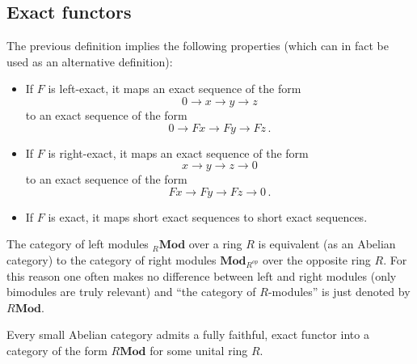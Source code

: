 \subsection{Exact functors}

    \begin{result}
        The previous definition implies the following properties (which can in fact be used as an alternative definition):
        \begin{itemize}
            \item If $F$ is left-exact, it maps an exact sequence of the form \[0\longrightarrow x\longrightarrow y\longrightarrow z\]
            to an exact sequence of the form \[0\longrightarrow Fx\longrightarrow Fy\longrightarrow Fz\,.\]
            \item If $F$ is right-exact, it maps an exact sequence of the form \[x\longrightarrow y\longrightarrow z\longrightarrow 0\]
            to an exact sequence of the form \[Fx\longrightarrow Fy\longrightarrow Fz\longrightarrow 0\,.\]
            \item If $F$ is exact, it maps short exact sequences to short exact sequences.
        \end{itemize}
    \end{result}

    \begin{notation}
        The category of left modules ${}_R\mathbf{Mod}$ over a ring $R$ is equivalent (as an Abelian category) to the category of right modules $\mathbf{Mod}_{R^{op}}$ over the opposite ring $R$. For this reason one often makes no difference between left and right modules (only bimodules are truly relevant) and ``the category of $R$-modules'' is just denoted by $R\mathbf{Mod}$.
    \end{notation}

    \begin{theorem}\label{cat:freyd_mitchell}
        Every small Abelian category admits a fully faithful, exact functor into a category of the form $R\mathbf{Mod}$ for some unital ring $R$.
    \end{theorem}

